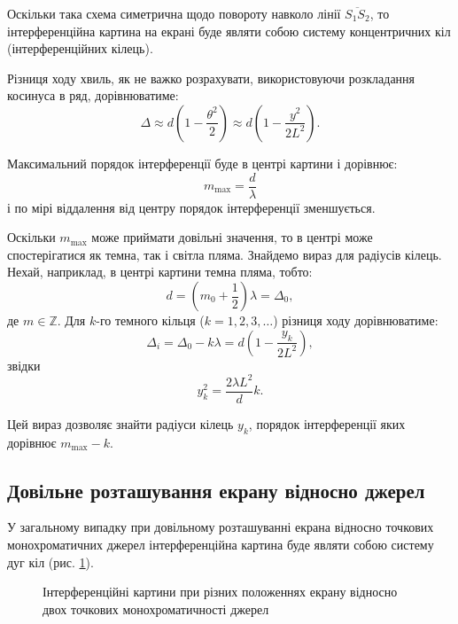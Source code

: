 Оскільки така схема симетрична щодо повороту навколо лінії $\overline{S_1S_2}$, то інтерференційна картина на екрані буде являти собою систему концентричних кіл (інтерференційних кілець).

Різниця ходу хвиль, як не важко розрахувати, використовуючи розкладання косинуса в ряд, дорівнюватиме:
\begin{equation}\label{eq:DeltaApprox}
    \Delta \approx d\left( 1 - \frac{\theta^2}{2}\right) \approx d\left( 1 - \frac{y^2}{2L^2}\right).
\end{equation}

Максимальний порядок інтерференції буде в центрі картини і дорівнює:
\[
    m_{\max} = \frac{d}{\lambda}
\]
і по мірі віддалення від центру порядок інтерференції зменшується. 

Оскільки $m_{\max}$ може приймати довільні значення, то в центрі може
спостерігатися як темна, так і світла пляма. Знайдемо вираз для радіусів
кілець. Нехай, наприклад, в центрі картини темна пляма, тобто:
\[
    d = \left( m_0 + \frac12 \right)\lambda = \Delta_0, 
\]
де $m \in \mathbb{Z}$.  Для $k$-го темного кільця ($k = 1,2,3,\ldots$) різниця ходу дорівнюватиме:
\[
    \Delta_i = \Delta_0 - k\lambda = d\left( 1 - \frac{y_k}{2L^2}\right),
\]
звідки
\begin{equation}\label{eq:RingRadius}
    y_k^2 = \frac{2\lambda L^2}{d} k.
\end{equation}

Цей вираз дозволяє знайти радіуси кілець $y_k$, порядок інтерференції яких дорівнює $m_{\max} - k$.

\subsection{Довільне розташування екрану відносно джерел}

У загальному випадку при довільному розташуванні екрана відносно точкових монохроматичних джерел інтерференційна картина буде являти собою систему дуг кіл (рис. \ref{fig:IntPic}).

\begin{figure}
\centering
\caption{Інтерференційні картини при різних положеннях екрану
відносно двох точкових монохроматичності джерел}
\label{fig:IntPic}
\end{figure}

